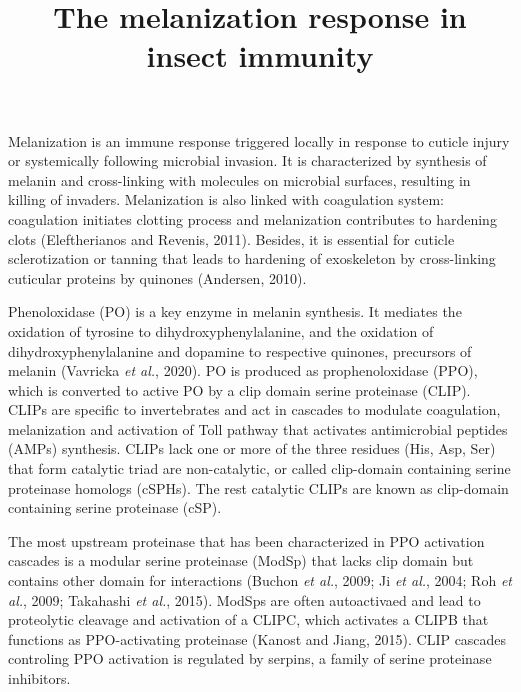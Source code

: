\documentclass[11pt]{article}
\title{The melanization response in insect immunity}
\author{}
\date{}
\begin{document}
  \maketitle

  \linenumbers
Melanization is an immune response triggered locally in response to cuticle injury or systemically following microbial invasion. 
It is characterized by synthesis of melanin and cross-linking with molecules on microbial surfaces, resulting in killing of invaders. 
Melanization is also linked with coagulation system: coagulation initiates clotting process and melanization contributes to hardening clots (Eleftherianos and Revenis, 2011). 
Besides, it is essential for cuticle sclerotization or tanning that leads to hardening of exoskeleton by cross-linking cuticular proteins by quinones (Andersen, 2010). 

\newline

Phenoloxidase (PO) is a key enzyme in melanin synthesis. 
It mediates the oxidation of tyrosine to dihydroxyphenylalanine, and the oxidation of dihydroxyphenylalanine and dopamine to respective quinones, precursors of melanin (Vavricka \textit{et al.}, 2020). 
PO is produced as prophenoloxidase (PPO), which is converted to active PO by a clip domain serine proteinase (CLIP). 
CLIPs are specific to invertebrates and act in cascades to modulate coagulation, melanization and activation of Toll pathway that activates antimicrobial peptides (AMPs) synthesis. 
CLIPs lack one or more of the three residues (His, Asp, Ser) that form catalytic triad are non-catalytic, or called clip-domain containing serine proteinase homologs (cSPHs). 
The rest catalytic CLIPs are known as clip-domain containing serine proteinase (cSP). 

\newline

The most upstream proteinase that has been characterized in PPO activation cascades is a modular serine proteinase (ModSp) that lacks clip domain but contains other domain for interactions (Buchon \textit{et al.}, 2009; Ji \textit{et al.}, 2004; Roh \textit{et al.}, 2009; Takahashi \textit{et al.}, 2015). 
ModSps are often autoactivaed and lead to proteolytic cleavage and activation of a CLIPC, which activates a CLIPB that functions as PPO-activating proteinase (Kanost and Jiang, 2015). 
CLIP cascades controling PPO activation is regulated by serpins, a family of serine proteinase inhibitors. 
\end{document}
